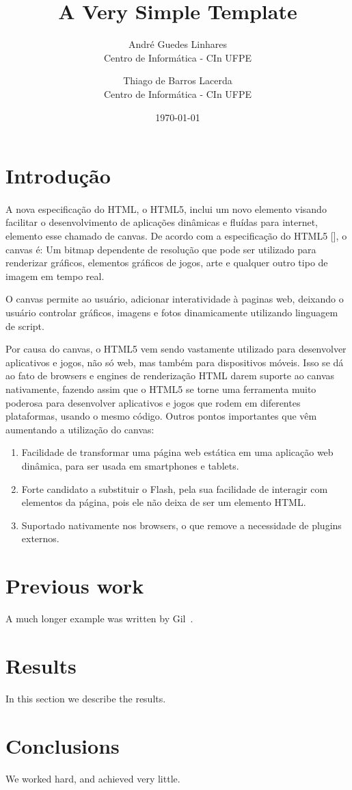 \documentclass[12pt]{article}
\title{A Very Simple \LaTeXe{} Template}
\author{
        André Guedes Linhares\\
        Centro de Informática - CIn UFPE\\
            \and
        Thiago de Barros Lacerda\\
        Centro de Informática - CIn UFPE\\
}
\date{\today}
\begin{document}
\maketitle

\section{Introdução}

\paragraph{}
A nova especificação do HTML, o HTML5, inclui um novo elemento visando facilitar o desenvolvimento de aplicações
dinâmicas e fluídas para internet, elemento esse chamado de canvas. De acordo com a especificação do HTML5 [], o canvas
é:
Um bitmap dependente de resolução que pode ser utilizado para renderizar gráficos, elementos gráficos de jogos, arte e
qualquer outro tipo de imagem em tempo real.

O canvas permite ao usuário, adicionar interatividade à paginas web, deixando o usuário controlar gráficos, imagens e
fotos dinamicamente utilizando linguagem de script.

Por causa do canvas, o HTML5 vem sendo vastamente utilizado para desenvolver aplicativos e jogos, não só web, mas também
para dispositivos móveis. Isso se dá ao fato de browsers e engines de renderização HTML darem suporte ao canvas
nativamente, fazendo assim que o HTML5 se torne uma ferramenta muito poderosa para desenvolver aplicativos e jogos que
rodem em diferentes plataformas, usando o mesmo código. Outros pontos importantes que vêm aumentando a utilização do
canvas:
\begin{enumerate}
\item Facilidade de transformar uma página web estática em uma aplicação web dinâmica, para ser usada em smartphones e
tablets.
\item Forte candidato a substituir o Flash, pela sua facilidade de interagir com elementos da página, pois ele não deixa de
ser um elemento HTML.
\item Suportado nativamente nos browsers, o que remove a necessidade de plugins externos.
\end{enumerate}


\section{Previous work}\label{previous work}
A much longer \LaTeXe{} example was written by Gil~\cite{Einstein}.

\section{Results}\label{results}
In this section we describe the results.

\section{Conclusions}\label{conclusions}
We worked hard, and achieved very little.



\end{document}
